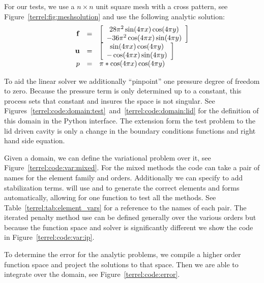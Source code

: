 For our tests, we use a $n\times n$ unit square mesh with a cross pattern, see
Figure~\ref{terrel:fig:meshsolution} and use the following analytic solution:
\begin{equation*}
\label{terrel:eqn:testcase}
\begin{array}{rcl}
  {\bf f} &=& \left[\begin{array}{c} 28\pi^2\sin(4\pi x)\cos(4\pi y) \\
      -36\pi^2\cos(4\pi x)\sin(4\pi y)
    \end{array}\right]\\
  {\bf u} &=& \left[\begin{array}{c} \sin(4\pi x)\cos(4\pi y) \\
      -\cos(4\pi x)\sin(4\pi y)
    \end{array}\right] \\
  p &=& \pi*\cos(4\pi x)\cos(4\pi y)
\end{array}
\end{equation*}

To aid the linear solver we additionally ``pinpoint'' one pressure degree of
freedom to zero.  Because the pressure term is only determined up to a
constant, this process sets that constant and insures the space is not
singular. See
Figures~\ref{terrel:code:domain:test}~and~\ref{terrel:code:domain:lid} for the
definition of this domain in the Python interface.  The extension form the test
problem to the lid driven cavity is only a change in the boundary conditions
functions and right hand side equation.


Given a domain, we can define the variational problem over it, see
Figure~\ref{terrel:code:var:mixed}.  For the mixed methods the code can take a
pair of names for the element family and orders.  Additionally we can specify
to add stabilization terms.  \dolfin{} will use \ffc{} and \fiat{} to generate the
correct elements and forms automatically, allowing for one function to test all
the methods.  See Table~\ref{terrel:tab:element_vars} for a reference to the
names of each pair.  The iterated penalty method use can be defined generally
over the various orders but because the function space and solver is
significantly different we show the code in Figure~\ref{terrel:code:var:ip}.

To determine the error for the analytic problems, we compile a higher order
function space and project the solutions to that space.  Then we are able to
integrate over the domain, see Figure~\ref{terrel:code:error}.


